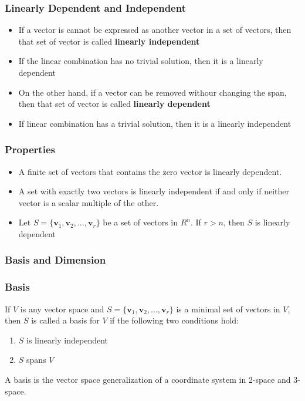 \documentclass[a4paper,12pt]{article}
\begin{document}
\subsubsection*{Linearly Dependent and Independent}
\begin{itemize}
  \item If a vector is cannot be expressed as another vector in a set of vectors, then that set of vector is called \textbf{linearly independent}
  \item[] If the linear combination has no trivial solution, then it is a linearly dependent
  \item On the other hand, if a vector can be removed withour changing the span, then that set of vector is called \textbf{linearly dependent}
  \item[] If linear combination has a trivial solution, then it is a linearly independent
\end{itemize}
\subsubsection*{Properties}
\begin{itemize}
  \item A finite set of vectors that contains the zero vector is linearly dependent.
  \item A set with exactly two vectors is linearly independent if and only if neither vector is a scalar multiple of the other.
  \item Let \(S=\{\textbf{v$_1$},\textbf{v$_2$},\dots,\textbf{v$_r$}\}\) be a set of vectors in \(R^n\). If \(r>n\), then \(S\) is linearly dependent
\end{itemize}

\subsubsection*{Basis and Dimension}
\subsubsection*{Basis}
If \(V\) is any vector space and \(S=\{\textbf{v$_1$},\textbf{v$_2$},\dots,\textbf{v$_r$}\}\) is a minimal set of vectors in \(V\), then \(S\) is called a basis for \(V\) if the following two conditions hold: \begin{enumerate}
  \item \(S\) is linearly independent
  \item \(S\) spans \(V\)
\end{enumerate}
A basis is the vector space generalization of a coordinate system in 2-space and 3-space.
\end{document}
